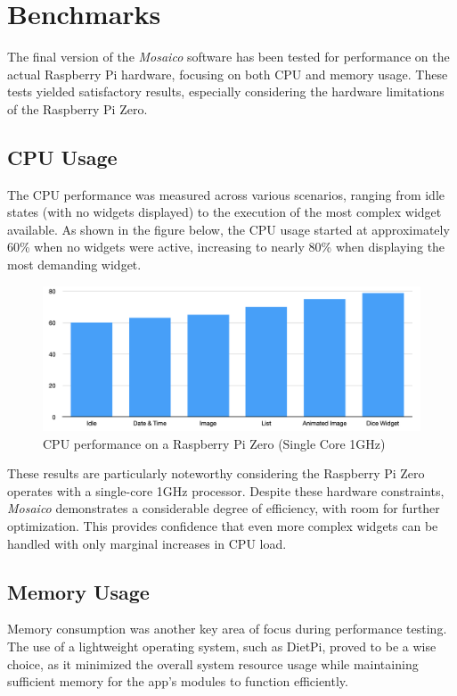 \section{Benchmarks}
The final version of the \textit{Mosaico} software has been tested for performance on the actual Raspberry Pi hardware, focusing on both CPU and memory usage. These tests yielded satisfactory results, especially considering the hardware limitations of the Raspberry Pi Zero.

\subsection{CPU Usage}

The CPU performance was measured across various scenarios, ranging from idle states (with no widgets displayed) to the execution of the most complex widget available. As shown in the figure below, the CPU usage started at approximately 60\% when no widgets were active, increasing to nearly 80\% when displaying the most demanding widget.

\begin{figure}[H]
    \centering
    \begin{minipage}[b]{0.98\textwidth}
        \centering
        \includegraphics[width=\textwidth]{tesi/img/benchmarks/CPU.png}
        \caption*{CPU performance on a Raspberry Pi Zero (Single Core 1GHz)}
    \end{minipage}
\end{figure}

These results are particularly noteworthy considering the Raspberry Pi Zero operates with a single-core 1GHz processor. Despite these hardware constraints, \textit{Mosaico} demonstrates a considerable degree of efficiency, with room for further optimization. This provides confidence that even more complex widgets can be handled with only marginal increases in CPU load.


\subsection{Memory Usage}
Memory consumption was another key area of focus during performance testing. The use of a lightweight operating system, such as DietPi, proved to be a wise choice, as it minimized the overall system resource usage while maintaining sufficient memory for the app's modules to function efficiently.

